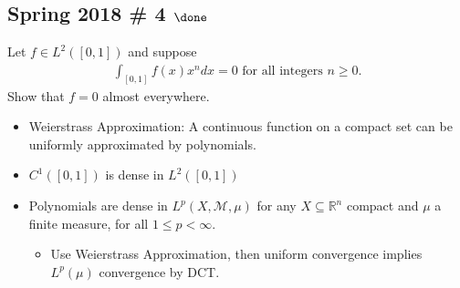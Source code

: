 \hypertarget{spring-2018-4-done}{%
\subsection{\texorpdfstring{Spring 2018 \# 4
\(\done\)}{Spring 2018 \# 4 \textbackslash done}}\label{spring-2018-4-done}}

Let \(f\in L^2([0, 1])\) and suppose
\begin{align*}
\int _{[0,1]} f(x) x^{n} d x=0 \text { for all integers } n \geq 0.
\end{align*}
Show that \(f = 0\) almost everywhere.

\begin{concept}

\envlist

\begin{itemize}
\tightlist
\item
  Weierstrass Approximation: A continuous function on a compact set can
  be uniformly approximated by polynomials.
\item
  \(C^1([0, 1])\) is dense in \(L^2([0, 1])\)
\item
  Polynomials are dense in \(L^p(X, \mathcal{M}, \mu)\) for any
  \(X\subseteq {\mathbb{R}}^n\) compact and \(\mu\) a finite measure,
  for all \(1\leq p < \infty\).

  \begin{itemize}
  \tightlist
  \item
    Use Weierstrass Approximation, then uniform convergence implies
    \(L^p(\mu)\) convergence by DCT.
  \end{itemize}
\end{itemize}

\end{concept}

